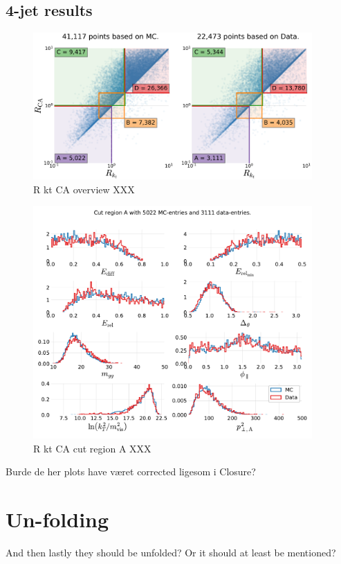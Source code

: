 \newpage

\subsection{4-jet results}
\label{subsec:q:gluon_splitting_results}


\begin{figure}[h!]
  \centerfloat
  \includegraphics[width=0.95\textwidth, trim=0 0 0 118, clip]{figures/quarks/gtag-R_kt_CA_overview-down_sample=1.00-ML_vars=vertex-selection=b-ejet_min=4-n_iter_RS_lgb=99-n_iter_RS_xgb=9-cdot_cut=0.90-version=19-njet=4.pdf}
  \caption[R kt CA overview  XXX \TODO]
          {R kt CA overview XXX \TODO
          } 
  \label{fig:q:R_kt_CA_overview}
\end{figure}

\begin{figure}[h!]
  \centerfloat
  \includegraphics[width=0.95\textwidth, trim=0 0 0 30, clip]{figures/quarks/gtag-R_kt_CA_histograms-down_sample=1.00-ML_vars=vertex-selection=b-ejet_min=4-n_iter_RS_lgb=99-n_iter_RS_xgb=9-cdot_cut=0.90-version=19-njet=4.pdf}
  \caption[R kt CA cut region A  XXX \TODO]
          {R kt CA cut region A XXX \TODO
          } 
  \label{fig:q:R_kt_CA_cut_A}
\end{figure}

Burde de her plots have været corrected ligesom i Closure? 

\newpage
\section{Un-folding}

And then lastly they should be unfolded? Or it should at least be mentioned?

